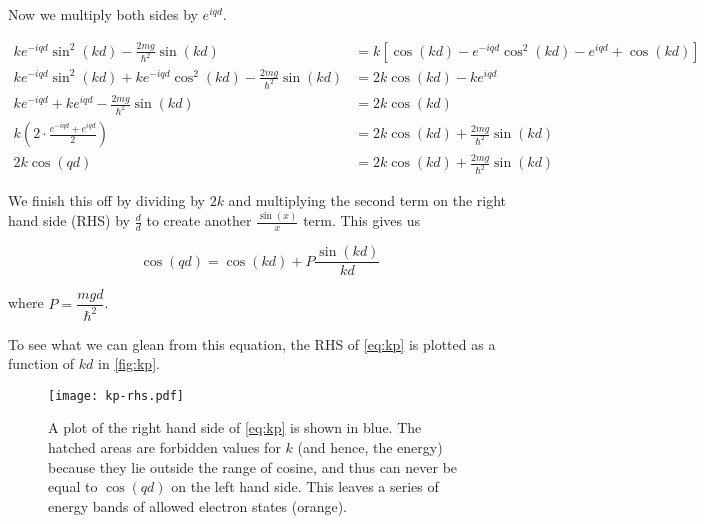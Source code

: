 \noindent Now we multiply both sides by $e^{iqd}$.

\begin{align*}
	ke^{-iqd}\sin^2(kd) - \frac{2mg}{\hbar^2}\sin(kd) &= k\left[ \cos(kd) - e^{-iqd}\cos^2(kd) - e^{iqd} + \cos(kd) \right] \\
	ke^{-iqd}\sin^2(kd) + ke^{-iqd}\cos^2(kd) - \frac{2mg}{\hbar^2}\sin(kd) &= 2k\cos(kd) - ke^{iqd} \\
	ke^{-iqd} + ke^{iqd} - \frac{2mg}{\hbar^2}\sin(kd) &= 2k\cos(kd) \\
	k \left(2 \cdot \frac{e^{-iqd} + e^{iqd}}{2} \right) &= 2k\cos(kd) + \frac{2mg}{\hbar^2}\sin(kd)\\
	2k\cos(qd) &= 2k\cos(kd) + \frac{2mg}{\hbar^2}\sin(kd)
\end{align*}

We finish this off by dividing by $2k$ and multiplying the second term on the right hand side (RHS) by $\frac{d}{d}$ to create another $\frac{\sin(x)}{x}$ term. 
This gives us

\begin{tcolorbox}[title = Kronig-Penney model allowed solutions] \vspace{-2ex}
	\begin{equation}
		\cos(qd) = \cos(kd) + P\frac{\sin(kd)}{kd} \label{eq:kp}
	\end{equation}
\end{tcolorbox}

\noindent where $P = \dfrac{mgd}{\hbar^2}$.

To see what we can glean from this equation, the RHS of \autoref{eq:kp} is plotted as a function of $kd$ in \autoref{fig:kp}.

\begin{figure}[!h]
	\centering 
	\texttt{[image: kp-rhs.pdf]}
	\caption{A plot of the right hand side of \autoref{eq:kp} is shown in blue. 
	The hatched areas are forbidden values for $k$ (and hence, the energy) because they lie outside the range of cosine, and thus can never be equal to $\cos(qd)$ on the left hand side. 
	This leaves a series of energy bands of allowed electron states (orange).}
	\label{fig:kp}
\end{figure}

